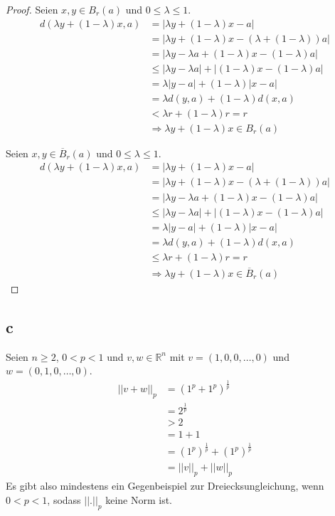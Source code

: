 \documentclass[10pt,a4paper]{article}
\begin{document}
\begin{proof}
Seien $x, y \in B_{r}(a)$ und $0 \le \lambda \le 1$.
\begin{align}
d(\lambda y + (1 - \lambda)x, a) & = |\lambda y + (1 - \lambda)x - a|\\
& = |\lambda y + (1 - \lambda)x - (\lambda + (1 - \lambda))a|\\
& = |\lambda y - \lambda a + (1 - \lambda)x - (1 - \lambda)a|\\
& \le |\lambda y - \lambda a| + |(1 - \lambda)x - (1 - \lambda)a|\\
& = \lambda |y - a| + (1 - \lambda) |x - a|\\
& = \lambda d(y, a) + (1 - \lambda) d(x, a)\\
& < \lambda r + (1 - \lambda) r = r\\
& \Rightarrow \lambda y + (1 - \lambda)x \in B_{r}(a)
\end{align}

Seien $x, y \in \overline{B}_{r}(a)$ und $0 \le \lambda \le 1$.
\begin{align}
d(\lambda y + (1 - \lambda)x, a) & = |\lambda y + (1 - \lambda)x - a|\\
& = |\lambda y + (1 - \lambda)x - (\lambda + (1 - \lambda))a|\\
& = |\lambda y - \lambda a + (1 - \lambda)x - (1 - \lambda)a|\\
& \le |\lambda y - \lambda a| + |(1 - \lambda)x - (1 - \lambda)a|\\
& = \lambda |y - a| + (1 - \lambda) |x - a|\\
& = \lambda d(y, a) + (1 - \lambda) d(x, a)\\
& \le \lambda r + (1 - \lambda) r = r\\
& \Rightarrow \lambda y + (1 - \lambda)x \in \overline{B}_{r}(a)
\end{align}
\end{proof}

\subsection*{c}

Seien $n \ge 2$, $0 < p < 1$ und $v, w \in \mathbb{R}^{n}$ mit $v = (1, 0, 0, \dots, 0)$ und $w = (0, 1, 0, \dots, 0)$.
\begin{align}
||v + w||_{p} & = (1^{p} + 1^{p})^{\frac{1}{p}}\\
& = 2^{\frac{1}{p}}\\
& > 2\\
& = 1 + 1\\
& = (1^{p})^{\frac{1}{p}} + (1^{p})^{\frac{1}{p}}\\
& = ||v||_{p} + ||w||_{p}
\end{align}
Es gibt also mindestens ein Gegenbeispiel zur Dreiecksungleichung, wenn $0 < p < 1$, sodass $||.||_{p}$ keine Norm ist.
\end{document}
